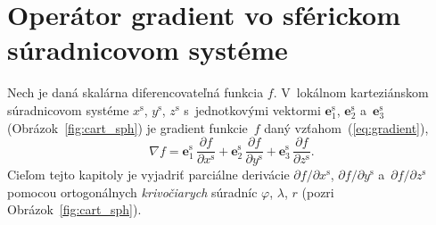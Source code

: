 \documentclass[a4paper,12pt]{book}
\let\vec\mathbf
\begin{document}
\section{Operátor gradient vo sférickom súradnicovom systéme}
\label{app:gradient_in_spherical_coordinates}

Nech je daná skalárna diferencovateľná funkcia $f$.  V~lokálnom karteziánskom 
súradnicovom systéme $x^{\mathrm{s}}$, $y^{\mathrm{s}}$, $z^{\mathrm{s}}$ 
s~jednotkovými vektormi $\vec e^\mathrm{s}_1$, $\vec e^\mathrm{s}_2$ a~$\vec 
e^\mathrm{s}_3$ (Obrázok~\ref{fig:cart_sph}) je gradient funkcie~$f$ daný 
vzťahom~(\ref{eq:gradient}),
%
\begin{equation}
\nabla f = \vec e^\mathrm{s}_1 \, \frac{\partial f}{\partial x^{\mathrm{s}}} 
+ \vec e^\mathrm{s}_2 \, \frac{\partial f}{\partial y^{\mathrm{s}}} + \vec 
e^\mathrm{s}_3 \, \frac{\partial f}{\partial z^{\mathrm{s}}}{.}
\end{equation}
%
Cieľom tejto kapitoly je vyjadriť parciálne derivácie $\partial f \slash 
\partial x^{\mathrm{s}}$, $\partial f \slash \partial y^{\mathrm{s}}$ 
a~$\partial f \slash \partial z^{\mathrm{s}}$ pomocou ortogonálnych 
\emph{krivočiarych} súradníc $\varphi$, $\lambda$, $r$ (pozri 
Obrázok~\ref{fig:cart_sph}).
\end{document}
